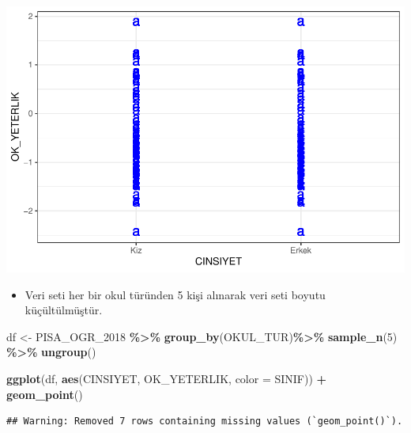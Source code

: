\documentclass[
  oneside]{book}
\newenvironment{Shaded}{\begin{snugshade}}{\end{snugshade}}
\newcommand{\AttributeTok}[1]{\textcolor[rgb]{0.13,0.29,0.53}{#1}}
\newcommand{\DecValTok}[1]{\textcolor[rgb]{0.00,0.00,0.81}{#1}}
\newcommand{\FunctionTok}[1]{\textcolor[rgb]{0.13,0.29,0.53}{\textbf{#1}}}
\newcommand{\NormalTok}[1]{#1}
\newcommand{\OtherTok}[1]{\textcolor[rgb]{0.56,0.35,0.01}{#1}}
\newcommand{\SpecialCharTok}[1]{\textcolor[rgb]{0.81,0.36,0.00}{\textbf{#1}}}
\providecommand{\tightlist}{%
  \setlength{\itemsep}{0pt}\setlength{\parskip}{0pt}}
\begin{document}
\begin{center}\includegraphics[width=1\linewidth]{15-betimleyici-istatistik_files/figure-latex/unnamed-chunk-41-1} \end{center}

\begin{itemize}
\tightlist
\item
  Veri seti her bir okul türünden 5 kişi alınarak veri seti boyutu küçültülmüştür.
\end{itemize}

\begin{Shaded}
\begin{Highlighting}[]
\NormalTok{df }\OtherTok{\textless{}{-}}\NormalTok{ PISA\_OGR\_2018 }\SpecialCharTok{\%\textgreater{}\%} \FunctionTok{group\_by}\NormalTok{(OKUL\_TUR)}\SpecialCharTok{\%\textgreater{}\%} \FunctionTok{sample\_n}\NormalTok{(}\DecValTok{5}\NormalTok{) }\SpecialCharTok{\%\textgreater{}\%} \FunctionTok{ungroup}\NormalTok{()}

\FunctionTok{ggplot}\NormalTok{(df, }\FunctionTok{aes}\NormalTok{(CINSIYET, OK\_YETERLIK, }\AttributeTok{color =}\NormalTok{ SINIF)) }\SpecialCharTok{+}
  \FunctionTok{geom\_point}\NormalTok{()}
\end{Highlighting}
\end{Shaded}

\begin{verbatim}
## Warning: Removed 7 rows containing missing values (`geom_point()`).
\end{verbatim}
\end{document}
